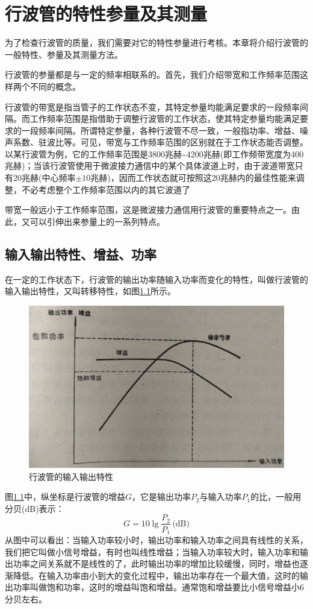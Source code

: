 \chapter{行波管的特性参量及其测量} \label{ch:11}
为了检查行波管的质量，我们需要对它的特性参量进行考核。本章将介绍行波管的一般特性、参量及其测量方法。

行波管的参量都是与一定的频率相联系的。首先，我们介绍带宽和工作频率范围这样两个不同的概念。


行波管的带宽是指当管子的工作状态不变，其特定参量均能满足要求的一段频率间隔。而工作频率范围是指借助于调整行波管的工作状态，使其特定参量均能满足要求的一段频率间隔。所谓特定参量，各种行波管不尽一致，一般指功率、增益、噪声系数、驻波比等。可见，带宽与工作频率范围的区别就在于工作状态能否调整。以某行波管为例，它的工作频率范围是3800兆赫\textasciitilde4200兆赫(即工作频带宽度为400兆赫)；当该行波管使用于微波接力通信中的某个具体波道上时，由于波道带宽只有20兆赫(中心频率$ \pm 10 $兆赫)，因而工作状态就可按照这20兆赫内的最佳性能来调整，不必考虑整个工作频率范围以内的其它波道了


带宽一般远小于工作频率范围，这是微波接力通信用行波管的重要特点之一。由此，又可以引伸出来参量上的一系列特点。
\section{ 输入输出特性、增益、功率}
在一定的工作状态下，行波管的输出功率随输入功率而变化的特性，叫做行波管的输入输出特性，又叫转移特性，如图\ref{ch11-1}所示。

\begin{figure}[phtb]
	\centering
	\includegraphics[width=0.6\linewidth]{figure/ch11-1}
	\caption{ 行波管的输入输出特性}
	\label{ch11-1}
\end{figure}

图\ref{ch11-1}中，纵坐标是行波管的增益$ G $，它是输出功率$ P_2 $与输入功率$ P_1 $的比，一般用分贝(dB)表示：
\begin{equation} \label{eq:11-1}
	G = 10\lg \frac{P_2}{P_1}\,\textrm{(dB)}
\end{equation}
从图中可以看出：当输入功率较小时，输出功率和输入功率之间具有线性的关系，我们把它叫做小信号增益，有时也叫线性增益；当输入功率较大时，输入功率和输出功率之间关系就不是线性的了，此时输出功率的增加比较缓慢，同时，增益也逐渐降低。在输入功率由小到大的变化过程中，输出功率存在一个最大值，这时的输出功率叫做饱和功率，这时的增益叫饱和增益。通常饱和增益要比小信号增益小6分贝左右。


